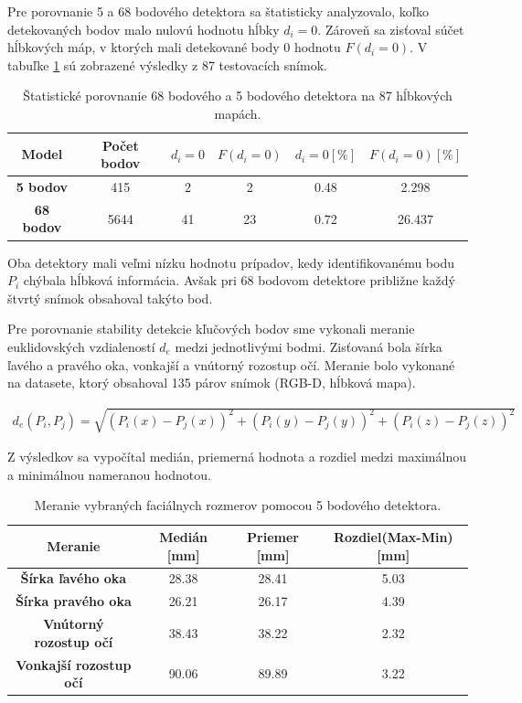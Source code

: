 Pre porovnanie 5 a 68 bodového detektora sa štatisticky analyzovalo, koľko detekovaných bodov malo nulovú hodnotu hĺbky $d_i=0$. Zároveň sa zisťoval súčet hĺbkových máp, v ktorých mali detekované body 0 hodnotu $F(d_i=0)$. V tabuľke \ref{tab:dlib:compare} sú zobrazené výsledky z 87 testovacích snímok.  

\begin{table}[h]
	\caption{\label{tab:dlib:compare} Štatistické porovnanie 68 bodového a 5 bodového detektora na 87 hĺbkových mapách.}
	\centering
	\begin{tabular}{cccccc}
		\toprule
		\textbf{Model} & \textbf{Počet bodov} & \textbf{$d_i=0$} & \textbf{$F(d_i=0)$} & \textbf{$d_i=0 [\%]$ } & \textbf{$F(d_i=0) [\%]$} \\ 
		\midrule
		\textbf{5 bodov} 	& 415 	& 2		& 2		& 0.48	& 2.298 \\
		\textbf{68 bodov} 	& 5644	& 41 	& 23	& 0.72	& 26.437 \\
		\bottomrule
	\end{tabular}
\end{table}

Oba detektory mali veľmi nízku hodnotu prípadov, kedy identifikovanému bodu $P_i$ chýbala hĺbková informácia. Avšak pri 68 bodovom detektore približne každý štvrtý snímok obsahoval takýto bod. 


Pre porovnanie stability detekcie kľučových bodov sme vykonali meranie euklidovských vzdialeností $d_e$ medzi jednotlivými bodmi. Zisťovaná bola šírka ľavého a pravého oka, vonkajší a vnútorný rozostup očí. Meranie bolo vykonané na datasete, ktorý obsahoval 135 párov snímok (RGB-D, hĺbková mapa).

\begin{equation}
\label{eq:euclidean}
\begin{aligned}
d_{e}\left(P_i,P_j\right)= \sqrt{\left(P_i(x) - P_j(x)\right)^2 + \left(P_i(y) - P_j(y)\right)^2 + \left(P_i(z) - P_j(z)\right)^2} 
\end{aligned}
\end{equation}

Z výsledkov sa vypočítal medián, priemerná hodnota a rozdiel medzi maximálnou a minimálnou nameranou hodnotou. 
 
\begin{table}[h]
	\caption{\label{tab:dlib:5points} Meranie vybraných faciálnych rozmerov pomocou 5 bodového detektora.}
	\centering
	\begin{tabular}{cccc}
		\toprule
		\textbf{Meranie} & \textbf{Medián [mm]} & \textbf{Priemer [mm]} & \textbf{Rozdiel(Max-Min) [mm]} \\ 
		\midrule
		\textbf{Šírka ľavého oka} 	& 28.38 & 28.41	& 5.03 \\
		\textbf{Šírka pravého oka} 	& 26.21	& 26.17 & 4.39 \\
		\textbf{Vnútorný rozostup očí} 	& 38.43	& 38.22 & 2.32 \\
		\textbf{Vonkajší rozostup očí} 	& 90.06	& 89.89 & 3.22 \\
		\bottomrule
	\end{tabular}
\end{table}

